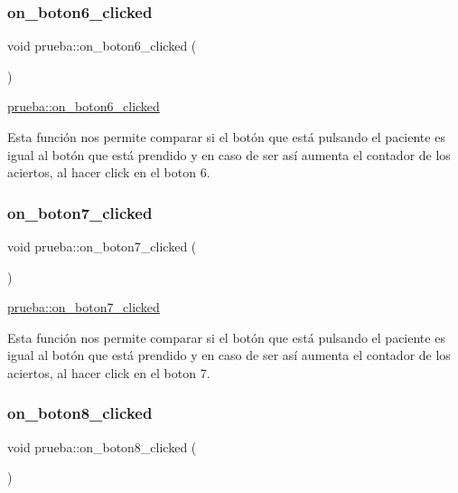 \subsubsection{\texorpdfstring{on\+\_\+boton6\+\_\+clicked}{on\_boton6\_clicked}}
{\footnotesize\ttfamily void prueba\+::on\+\_\+boton6\+\_\+clicked (\begin{DoxyParamCaption}{ }\end{DoxyParamCaption})\hspace{0.3cm}{\ttfamily [slot]}}



\hyperlink{classprueba_a8d324e5b5d7e37fd16e9e287bbcb5ea5}{prueba\+::on\+\_\+boton6\+\_\+clicked} 

Esta función nos permite comparar si el botón que está pulsando el paciente es igual al botón que está prendido y en caso de ser así aumenta el contador de los aciertos, al hacer click en el boton 6. \mbox{\label{classprueba_a22855fb3346928da988d6a8ed4dd466b}} 
\subsubsection{\texorpdfstring{on\+\_\+boton7\+\_\+clicked}{on\_boton7\_clicked}}
{\footnotesize\ttfamily void prueba\+::on\+\_\+boton7\+\_\+clicked (\begin{DoxyParamCaption}{ }\end{DoxyParamCaption})\hspace{0.3cm}{\ttfamily [slot]}}



\hyperlink{classprueba_a22855fb3346928da988d6a8ed4dd466b}{prueba\+::on\+\_\+boton7\+\_\+clicked} 

Esta función nos permite comparar si el botón que está pulsando el paciente es igual al botón que está prendido y en caso de ser así aumenta el contador de los aciertos, al hacer click en el boton 7. \mbox{\label{classprueba_adead6ef4b051b587a91e3fd1037a65dd}} 
\subsubsection{\texorpdfstring{on\+\_\+boton8\+\_\+clicked}{on\_boton8\_clicked}}
{\footnotesize\ttfamily void prueba\+::on\+\_\+boton8\+\_\+clicked (\begin{DoxyParamCaption}{ }\end{DoxyParamCaption})\hspace{0.3cm}{\ttfamily [slot]}}



